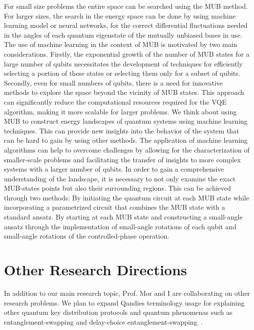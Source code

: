 \documentclass[12pt, a4paper]{article}
\begin{document}
    For small size problems the entire space can be searched using the MUB method. For larger sizes,
    the search in the energy space can be done by using machine learning model or neural networks, for the correct differential
    fluctuations needed in the angles of each quantum eigenstate of the mutually unbiased bases in use.
    The use of machine learning in the context of MUB is motivated by two main considerations.
    Firstly, the exponential growth of the number of MUB states for a large number of qubits necessitates the development
    of techniques for efficiently selecting a portion of these states or selecting them only for a subset of qubits.
    Secondly, even for small numbers of qubits, there is a need for innovative methods to explore the space beyond the
    vicinity of MUB states.
    This approach can significantly reduce the computational resources required for the VQE algorithm,
    making it more scalable for larger problems.
    We think about using MUB to construct energy landscapes of quantum systems using machine learning techniques.
    This can provide new insights into the behavior of the system that can be hard to gain by using other methods.
    The application of machine learning algorithms can help to overcome challenges by allowing for the
    characterization of smaller-scale problems and facilitating the transfer of insights to more complex systems with a
    larger number of qubits.
    In order to gain a comprehensive understanding of the landscape, it is necessary to not only examine the exact
    MUB-states points but also their surrounding regions.
    This can be achieved through two methods:
    By initiating the quantum circuit at each MUB state while incorporating a parametrized circuit that combines the MUB state
    with a standard ansatz.
    By starting at each MUB state and constructing a small-angle ansatz through the implementation of small-angle
    rotations of each qubit and small-angle rotations of the controlled-phase operation.


    \section{Other Research Directions}\label{sec:other-research-directions}
    In addition to our main research topic, Prof. Mor and I are collaborating on other research problems.
    We plan to expand Qandies \cite{lin2020quantum} \cite{lin2021quantum} \cite{mor2022digital} terminology
    usage for explaining other quantum key distribution protocols and quantum phenomenas such as
    entanglement-swapping and delay-choice entanglement-swapping~\cite{ma2016delayed}.

    
    
\end{document}
